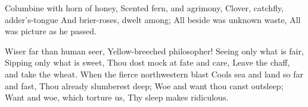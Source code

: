 \begin{poem}
\begin{stanza}
			Columbine with horn of honey,\verseline
			Scented fern, and agrimony,\verseline
			Clover, catchfly, adder's-tongue\verseline
			And brier-roses, dwelt among;\verseline
			All beside was unknown waste,\verseline
			All was picture as he passed.
	\end{stanza}
	\begin{stanza}
			Wiser far than human seer,\verseline
			Yellow-breeched philosopher!\verseline
			Seeing only what is fair,\verseline
			Sipping only what is sweet,\verseline
			Thou dost mock at fate and care,\verseline
			Leave the chaff, and take the wheat.\verseline
			When the fierce northwestern blast\verseline
			Cools sea and land so far and fast,\verseline
			Thou already slumberest deep;\verseline
			Woe and want thou canst outsleep;\verseline
			Want and woe, which torture us,\verseline
			Thy sleep makes ridiculous.
	\end{stanza}
\end{poem}
